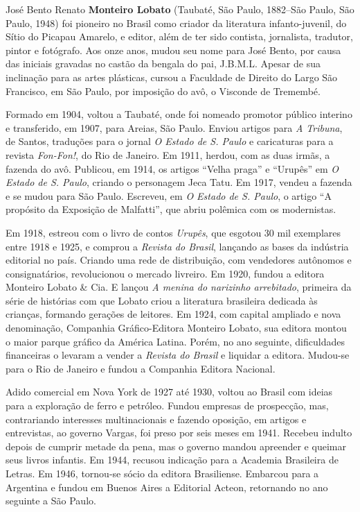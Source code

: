 
José Bento Renato \textbf{Monteiro Lobato} (Taubaté, São Paulo, 1882--São Paulo, São Paulo, 1948) foi pioneiro no Brasil como criador da
literatura infanto-juvenil, do Sítio do Picapau Amarelo, e editor, além
de ter sido contista, jornalista, tradutor, pintor e fotógrafo. Aos onze
anos, mudou seu nome para José Bento, por causa das iniciais gravadas no
castão da bengala do pai, J.B.M.L. Apesar de sua inclinação para as
artes plásticas, cursou a Faculdade de Direito do Largo São Francisco,
em São Paulo, por imposição do avô, o Visconde de Tremembé.

Formado em 1904, voltou a Taubaté, onde foi nomeado promotor público
interino e transferido, em 1907, para Areias, São Paulo. Enviou artigos
para \emph{A Tribuna}, de Santos, traduções para o jornal \emph{O Estado
de S. Paulo} e caricaturas para a revista \emph{Fon-Fon!}, do Rio de
Janeiro. Em 1911, herdou, com as duas irmãs, a fazenda do avô. Publicou,
em 1914, os artigos ``Velha praga'' e ``Urupês'' em \emph{O Estado de S.
Paulo}, criando o personagem Jeca Tatu. Em 1917, vendeu a fazenda e se
mudou para São Paulo. Escreveu, em \emph{O Estado de S. Paulo}, o artigo
``A propósito da Exposição de Malfatti'', que abriu polêmica com os
modernistas.

Em 1918, estreou com o livro de contos \emph{Urupês}, que esgotou 30 mil
exemplares entre 1918 e 1925, e comprou a \emph{Revista do Brasil},
lançando as bases da indústria editorial no país. Criando uma rede de
distribuição, com vendedores autônomos e consignatários, revolucionou o
mercado livreiro. Em 1920, fundou a editora Monteiro Lobato \& Cia. E
lançou \emph{A menina do narizinho arrebitado}, primeira da série de
histórias com que Lobato criou a literatura brasileira dedicada às
crianças, formando gerações de leitores. Em 1924, com capital ampliado e
nova denominação, Companhia Gráfico-Editora Monteiro Lobato, sua editora
montou o maior parque gráfico da América Latina. Porém, no ano seguinte,
dificuldades financeiras o levaram a vender a \emph{Revista do Brasil} e
liquidar a editora. Mudou-se para o Rio de Janeiro e fundou a Companhia
Editora Nacional.

Adido comercial em Nova York de 1927 até 1930, voltou ao Brasil com
ideias para a exploração de ferro e petróleo. Fundou empresas de
prospecção, mas, contrariando interesses multinacionais e fazendo
oposição, em artigos e entrevistas, ao governo Vargas, foi preso por
seis meses em 1941. Recebeu indulto depois de cumprir metade da pena,
mas o governo mandou apreender e queimar seus livros infantis. Em 1944,
recusou indicação para a Academia Brasileira de Letras. Em 1946,
tornou-se sócio da editora Brasiliense. Embarcou para a Argentina e
fundou em Buenos Aires a Editorial Acteon, retornando no ano seguinte a
São Paulo.

